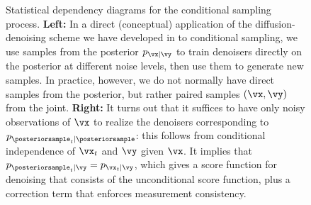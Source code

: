 \documentclass[../../book-main.tex]{subfiles}
\begin{document}
\begin{figure}[t]
    \centering
    \begin{subfigure}{0.45\textwidth}
        \vspace{0.75cm}
        \centering
        \vspace{0.75cm}
        \caption{}
        \label{fig:left}
    \end{subfigure}
    \hfill
    \begin{subfigure}{0.45\textwidth}
        \centering
        \caption{}
        \label{fig:right}
    \end{subfigure}
    \caption{Statistical dependency diagrams for the conditional
        sampling process.
        \textbf{Left:} In a direct (conceptual) application of the
        diffusion-denoising scheme
        we have developed in  to conditional sampling, we use
        samples from the posterior $p_{\vx \mid \vy}$ to train
        denoisers directly on
        the posterior at different noise levels, then use them to generate new
        samples. In practice, however, we do not normally have direct
        samples from the
        posterior, but rather paired samples $(\vx, \vy)$ from the joint.
        \textbf{Right:} It turns out that it suffices to have only
        noisy observations
        of $\vx$ to realize the denoisers corresponding to
        $p_{\posteriorsample_t \mid
        \posteriorsample}$: this follows from conditional
        independence of $\vx_t$ and
        $\vy$ given $\vx$. It implies that $p_{\posteriorsample_t \mid \vy} =
        p_{\vx_t \mid
        \vy}$, which gives a score function for denoising that consists of the
        unconditional score function, plus a correction term that
        enforces measurement
    consistency.}
    \label{fig:posterior-sampling-cds}
\end{figure}
\end{document}
